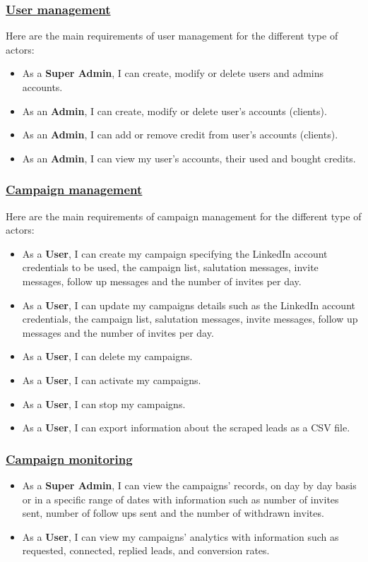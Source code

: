 \subsubsection*{\underline{User management}}
Here are the main requirements of user management for the different type of actors:
\begin{itemize}
	\item As a \textbf{Super Admin}, I can create, modify or delete users and admins accounts.
	\item As an \textbf{Admin}, I can create, modify or delete user's accounts (clients).
	\item As an \textbf{Admin}, I can add or remove credit from user's accounts (clients).
	\item As an \textbf{Admin}, I can view my user's accounts, their used and bought credits.
\end{itemize}

\subsubsection*{\underline{Campaign management}}
Here are the main requirements of campaign management for the different type of actors:
\begin{itemize}
	\item As a \textbf{User}, I can create my campaign specifying the LinkedIn account credentials to be used, the campaign list, salutation messages, invite messages, follow up messages and the number of invites per day.
	\item As a \textbf{User}, I can update my campaigns details such as the LinkedIn account credentials, the campaign list, salutation messages, invite messages, follow up messages and the number of invites per day.
	\item As a \textbf{User}, I can delete my campaigns.
	\item As a \textbf{User}, I can activate my campaigns.
	\item As a \textbf{User}, I can stop my campaigns.
	\item As a \textbf{User}, I can export information about the scraped leads as a CSV file.
\end{itemize}

\subsubsection*{\underline{Campaign monitoring}}
\begin{itemize}
	\item As a \textbf{Super Admin}, I can view the campaigns' records, on day by day basis or in a specific range of dates with information such as number of invites sent, number of follow ups sent and the number of withdrawn invites.
	\item As a \textbf{User}, I can view my campaigns' analytics with information such as requested, connected, replied leads, and conversion rates.
\end{itemize}

